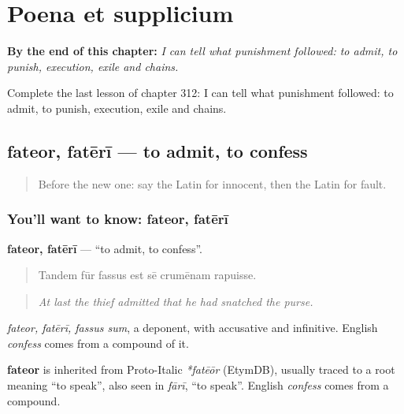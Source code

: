 
\chapter{Poena et supplicium}
\label{ch:la-poena-et-supplicium}

\begin{chapteropening}
\textbf{By the end of this chapter:} \emph{I can tell what punishment followed: to admit, to punish, execution, exile and chains.}

Complete the last lesson of chapter 312: I can tell what punishment followed: to admit, to punish, execution, exile and chains.
\end{chapteropening}

\section[fateor, fatērī]{fateor, fatērī — to admit, to confess}

\label{lesson:LA-C312-fateor}



\begin{quote}
Before the new one: say the Latin for innocent, then the Latin for fault.
\end{quote}

\subsection*{You'll want to know: fateor, fatērī}
\textbf{fateor, fatērī} — \textquotedblleft{}to admit, to confess\textquotedblright{}.

\begin{quote}
Tandem fūr fassus est sē crumēnam rapuisse.
\end{quote}

\begin{quote}
\emph{At last the thief admitted that he had snatched the purse.}
\end{quote}

\emph{fateor, fatērī, fassus sum}, a deponent, with accusative and infinitive. English \emph{confess} comes from a compound of it.

\begin{cousinweb}
\textbf{fateor} is inherited from Proto-Italic \emph{*fatēōr} (EtymDB), usually traced to a root meaning \textquotedblleft{}to speak\textquotedblright{}, also seen in \emph{fārī}, \textquotedblleft{}to speak\textquotedblright{}. English \emph{confess} comes from a compound.
\end{cousinweb}

